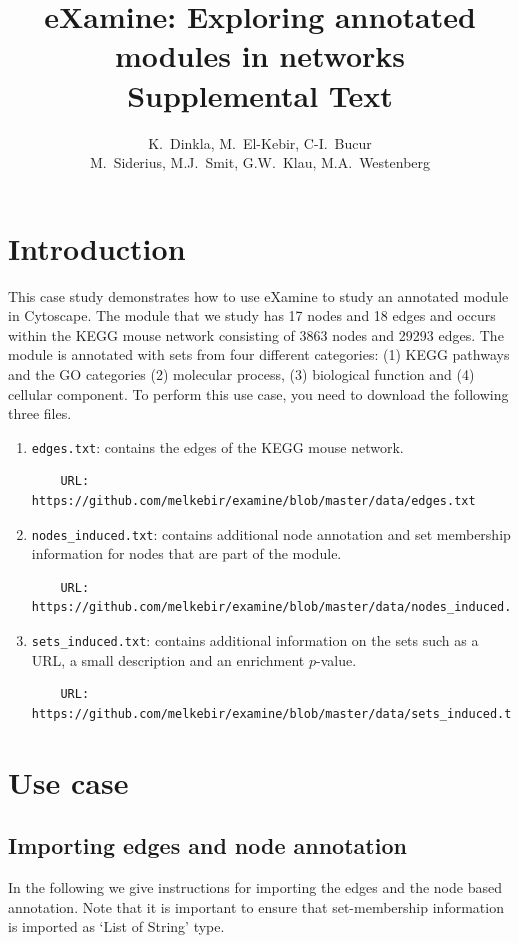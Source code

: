 \documentclass[a4paper,11pt]{article}
\title{eXamine: Exploring annotated modules in networks\\Supplemental Text}
\author{K.~Dinkla, M.~El-Kebir, C-I.~Bucur\\M.~Siderius, M.J.~Smit, G.W.~Klau,
M.A.~Westenberg}
\begin{document}
\maketitle
\tableofcontents

\section{Introduction}
This case study demonstrates how to use eXamine to study an annotated module
in Cytoscape. The module that we study has 17 nodes and 18 edges and occurs
within the KEGG mouse network consisting of 3863 nodes and 29293 edges. The
module is annotated with sets from four different categories: (1) KEGG pathways
and the GO categories (2) molecular process, (3) biological function and (4)
cellular component. To perform this use case, you need to download the following
three files. 
\begin{enumerate}
  \item \texttt{edges.txt}: contains the edges of the KEGG mouse network.
    \begin{verbatim}
    URL: https://github.com/melkebir/examine/blob/master/data/edges.txt
    \end{verbatim}
  \item \texttt{nodes\_induced.txt}: contains additional node annotation and
    set membership information for nodes that are part of the module.
    \begin{verbatim}
    URL: https://github.com/melkebir/examine/blob/master/data/nodes_induced.txt
    \end{verbatim}
  \item \texttt{sets\_induced.txt}: contains additional information on the sets
    such as a URL, a small description and an enrichment $p$-value.
    \begin{verbatim}
    URL: https://github.com/melkebir/examine/blob/master/data/sets_induced.txt
    \end{verbatim}
\end{enumerate}

\section{Use case}

\subsection{Importing edges and node annotation}

In the following we give instructions for importing the edges and the node based
annotation. Note that it is important to ensure that set-membership
information is imported as `List of String' type.
\end{document}
